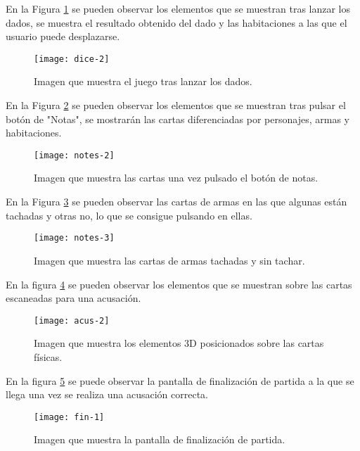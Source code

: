 En la Figura \ref{figura-dado-1} se pueden observar los elementos que se muestran tras lanzar los dados, se muestra el resultado obtenido del dado y las habitaciones a las que el usuario puede desplazarse.

\begin{figure}[h]
  \centering
  \texttt{[image: dice-2]}
  \caption{Imagen que muestra el juego tras lanzar los dados.}
  \label{figura-dado-1}
\end{figure}

En la Figura \ref{figura-notas-1} se pueden observar los elementos que se muestran tras pulsar el botón de "Notas", se mostrarán las cartas diferenciadas por personajes, armas y habitaciones.

\begin{figure}[h]
  \centering
  \texttt{[image: notes-2]}
  \caption{Imagen que muestra las cartas una vez pulsado el botón de notas.}
  \label{figura-notas-1}
\end{figure}

En la Figura \ref{figura-notas-2} se pueden observar las cartas de armas en las que algunas están tachadas y otras no, lo que se consigue pulsando en ellas.

\begin{figure}[h]
  \centering
  \texttt{[image: notes-3]}
  \caption{Imagen que muestra las cartas de armas tachadas y sin tachar.}
  \label{figura-notas-2}
\end{figure}

\newpage

En la figura \ref{figura-acus-1} se pueden observar los elementos que se muestran sobre las cartas escaneadas para una acusación.

\begin{figure}[h]
  \centering
  \texttt{[image: acus-2]}
  \caption{Imagen que muestra los elementos 3D posicionados sobre las cartas físicas.}
  \label{figura-acus-1}
\end{figure}

En la figura \ref{figura-fin-1} se puede observar la pantalla de finalización de partida a la que se llega una vez se realiza una acusación correcta.

\begin{figure}[h]
  \centering
  \texttt{[image: fin-1]}
  \caption{Imagen que muestra la pantalla de finalización de partida.}
  \label{figura-fin-1}
\end{figure}

